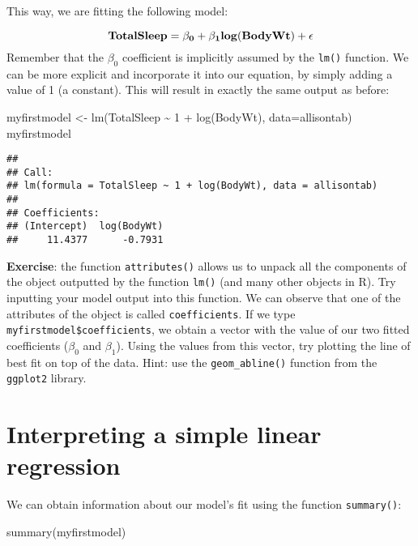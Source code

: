 \documentclass[
]{book}
\newenvironment{Shaded}{\begin{snugshade}}{\end{snugshade}}
\newcommand{\AttributeTok}[1]{\textcolor[rgb]{0.77,0.63,0.00}{#1}}
\newcommand{\DecValTok}[1]{\textcolor[rgb]{0.00,0.00,0.81}{#1}}
\newcommand{\FunctionTok}[1]{\textcolor[rgb]{0.00,0.00,0.00}{#1}}
\newcommand{\NormalTok}[1]{#1}
\newcommand{\OtherTok}[1]{\textcolor[rgb]{0.56,0.35,0.01}{#1}}
\newcommand{\SpecialCharTok}[1]{\textcolor[rgb]{0.00,0.00,0.00}{#1}}
\begin{document}
This way, we are fitting the following model:

\[\bf{TotalSleep} = \beta_0 + \beta_1 \bf{log(BodyWt)} + \bf{\epsilon}\]
Remember that the \(\beta_0\) coefficient is implicitly assumed by the \texttt{lm()} function. We can be more explicit and incorporate it into our equation, by simply adding a value of 1 (a constant). This will result in exactly the same output as before:

\begin{Shaded}
\begin{Highlighting}[]
\NormalTok{myfirstmodel }\OtherTok{\textless{}{-}} \FunctionTok{lm}\NormalTok{(TotalSleep }\SpecialCharTok{\textasciitilde{}} \DecValTok{1} \SpecialCharTok{+} \FunctionTok{log}\NormalTok{(BodyWt), }\AttributeTok{data=}\NormalTok{allisontab)  }
\NormalTok{myfirstmodel}
\end{Highlighting}
\end{Shaded}

\begin{verbatim}
## 
## Call:
## lm(formula = TotalSleep ~ 1 + log(BodyWt), data = allisontab)
## 
## Coefficients:
## (Intercept)  log(BodyWt)  
##     11.4377      -0.7931
\end{verbatim}

\textbf{Exercise}: the function \texttt{attributes()} allows us to unpack all the components of the object outputted by the function \texttt{lm()} (and many other objects in R). Try inputting your model output into this function. We can observe that one of the attributes of the object is called \texttt{coefficients}. If we type \texttt{myfirstmodel\$coefficients}, we obtain a vector with the value of our two fitted coefficients (\(\beta_0\) and \(\beta_1\)). Using the values from this vector, try plotting the line of best fit on top of the data. Hint: use the \texttt{geom\_abline()} function from the \texttt{ggplot2} library.

\hypertarget{interpreting-a-simple-linear-regression-1}{%
\section{Interpreting a simple linear regression}\label{interpreting-a-simple-linear-regression-1}}

We can obtain information about our model's fit using the function \texttt{summary()}:

\begin{Shaded}
\begin{Highlighting}[]
\FunctionTok{summary}\NormalTok{(myfirstmodel)}
\end{Highlighting}
\end{Shaded}
\end{document}
